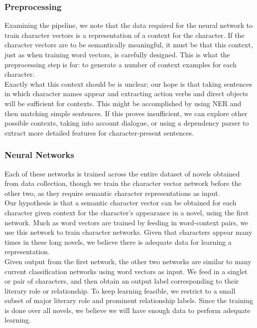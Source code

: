 \documentclass[12pt]{article}
\begin{document}
\subsubsection{Preprocessing}
    Examining the pipeline, we note that the data required for the neural network to train character vectors is a representation of a context for the character. If the character vectors are to be semantically meaningful, it must be that this context, just as when training word vectors, is carefully designed. This is what the preprocessing step is for: to generate a number of context examples for each character. \\

    Exactly what this context should be is unclear; our hope is that taking sentences in which character names appear and extracting action verbs and direct objects will be sufficient for contexts. This might be accomplished by using NER and then matching simple sentences. If this proves insufficient, we can explore other possible contexts, taking into account dialogue, or using a dependency parser to extract more detailed features for character-present sentences.

\subsubsection{Neural Networks}
    Each of these networks is trained across the entire dataset of novels obtained from data collection, though we train the character vector network before the other two, as they require semantic character representations as input. \\

    Our hypothesis is that a semantic character vector can be obtained for each character given context for the character's appearance in a novel, using the first network. Much as word vectors are trained by feeding in word-context pairs, we use this network to train character networks. Given that characters appear many times in these long novels, we believe there is adequate data for learning a representation. \\

    Given output from the first network, the other two networks are similar to many current classification networks using word vectors as input. We feed in a singlet or pair of characters, and then obtain an output label corresponding to their literary role or relationship. To keep learning feasible, we restrict to a small subset of major literary role and prominent relationship labels. Since the training is done over all novels, we believe we will have enough data to perform adequate learning. 
\end{document}
